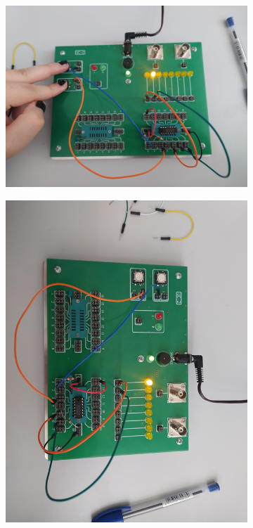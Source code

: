 \begin{itemize}
\begin{figure}[H]
\begin{subfigure}[H]{0.4\textwidth}
                \includegraphics[width=\textwidth]{img/5_2/1653500525121_scaled.png}
            \end{subfigure}
            \begin{subfigure}[H]{0.4\textwidth}
                \includegraphics[width=\textwidth]{img/5_2/1653500525099_scaled.png}

\end{subfigure}
\end{figure}
\end{itemize}
